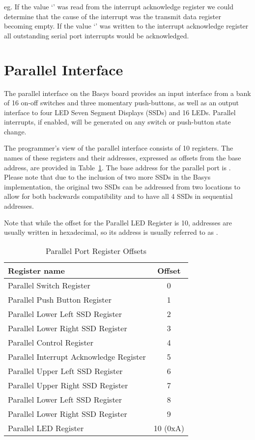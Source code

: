 \noindent
eg. If the value `' was read from the interrupt
acknowledge register we could determine that the cause of the
interrupt was the transmit data register becoming empty. If the value
`' was written to the interrupt acknowledge register all
outstanding serial port interrupts would be acknowledged.

\section{Parallel Interface}

The parallel interface on the Basys board provides an input interface
from a bank of 16 on-off switches and three momentary push-buttons, as
well as an output interface to four LED Seven Segment Displays (SSDs)
and 16 LEDs.
Parallel interrupts, if enabled, will be generated on any switch or
push-button state change.

The programmer's view of the parallel interface consists of 10
registers. The names of these registers and their addresses,
expressed as offsets from the base address, are provided in
Table~\ref{table:parallel_offsets}. The base address for the parallel
port is \src{\LOCPARABASE}. Please note that due to the inclusion of
two more SSDs in the Basys implementation, the original two SSDs can
be addressed from two locations to allow for both backwards compatibility
and to have all 4 SSDs in sequential addresses.

Note that while the offset for the Parallel LED Register is 10, addresses
are usually written in hexadecimal, so its address is usually referred to
as .

\begin{table}[h]
\begin{center}
\begin{tabular}{|l|c|}
\hline
\textbf{Register name} & \textbf{Offset} \\
\hline
Parallel Switch Register & 0 \\
\hline
Parallel Push Button Register & 1 \\
\hline
Parallel Lower Left SSD Register & 2 \\
\hline
Parallel Lower Right SSD Register & 3 \\
\hline
Parallel Control Register & 4 \\
\hline
Parallel Interrupt Acknowledge Register & 5 \\
\hline
Parallel Upper Left SSD Register & 6 \\
\hline
Parallel Upper Right SSD Register & 7 \\
\hline
Parallel Lower Left SSD Register & 8 \\
\hline
Parallel Lower Right SSD Register & 9 \\
\hline
Parallel LED Register & 10 (0xA) \\
\hline
\end{tabular}
\caption{Parallel Port Register Offsets}
\label{table:parallel_offsets}
\end{center}
\end{table}

